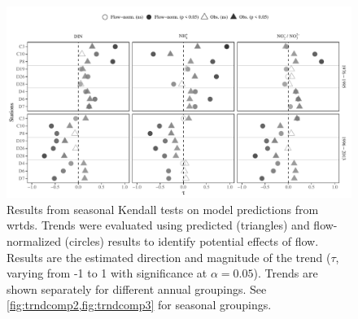 \documentclass[journal = esthag, manuscript = article]{achemso}\usepackage[]{graphicx}\usepackage[]{color}
\begin{document}
\begin{figure}
\centering
\includegraphics[width=1\textwidth,page=1]{figs/trndcomp1.pdf}
\caption{Results from seasonal Kendall tests on model predictions from \ac{wrtds}. Trends were evaluated using predicted (triangles) and flow-normalized (circles) results to identify potential effects of flow. Results are the estimated direction and magnitude of the trend ($\tau$, varying from -1 to 1 with significance at $\alpha = 0.05$). Trends are shown separately for different annual groupings. See \cref{fig:trndcomp2,fig:trndcomp3} for seasonal groupings.}
\label{fig:trndcomp1}   
\end{figure}
\end{document}
